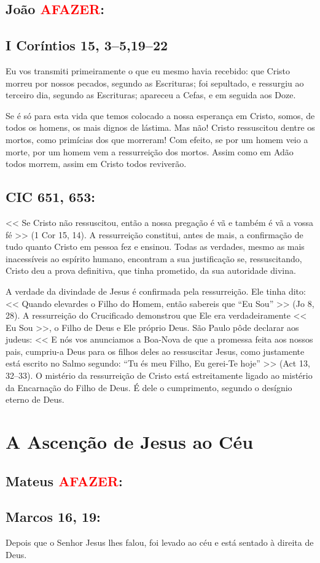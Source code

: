 \documentclass[10pt,a5paper]{book}
\newcommand{\from}[1]{\subsection*{#1}}
\newcommand{\TODO}{\textcolor{red}{\ttfamily AFAZER}}
\begin{document}
\from{João \TODO:}

\from{I Coríntios 15, 3--5,19--22}

Eu vos transmiti primeiramente o que eu mesmo havia recebido:
que Cristo morreu por nossos pecados, segundo as Escrituras;
foi sepultado, e ressurgiu ao terceiro dia, segundo as Escrituras;
apareceu a Cefas, e em seguida aos Doze.

Se é só para esta vida que temos colocado a nossa esperança em Cristo, somos, de todos os homens, os mais dignos de lástima.
Mas não! Cristo ressuscitou dentre os mortos, como primícias dos que morreram!
Com efeito, se por um homem veio a morte, por um homem vem a ressurreição dos mortos.
Assim como em Adão todos morrem, assim em Cristo todos reviverão.

\from{CIC 651, 653:}

<< Se Cristo não ressuscitou, então a nossa pregação é vã e também é vã a vossa fé >> (1 Cor 15, 14).
A ressurreição constitui, antes de mais, a confirmação de tudo quanto Cristo em pessoa fez e ensinou.
Todas as verdades, mesmo as mais inacessíveis ao espírito humano, encontram a sua justificação se, ressuscitando, Cristo deu a prova definitiva, que tinha prometido, da sua autoridade divina.

A verdade da divindade de Jesus é confirmada pela ressurreição.
Ele tinha dito:
<< Quando elevardes o Filho do Homem, então sabereis que ``Eu Sou'' >> (Jo 8, 28).
A ressurreição do Crucificado demonstrou que Ele era verdadeiramente << Eu Sou >>, o Filho de Deus e Ele próprio Deus.
São Paulo pôde declarar aos judeus:
<< E nós vos anunciamos a Boa-Nova de que a promessa feita aos nossos pais, cumpriu-a Deus para os filhos deles ao ressuscitar Jesus, como justamente está escrito no Salmo segundo:
``Tu és meu Filho, Eu gerei-Te hoje'' >> (Act 13, 32--33).
O mistério da ressurreição de Cristo está estreitamente ligado ao mistério da Encarnação do Filho de Deus.
É dele o cumprimento, segundo o desígnio eterno de Deus.


\section{A Ascenção de Jesus ao Céu}

\from{Mateus \TODO:}

\from{Marcos 16, 19:}

Depois que o Senhor Jesus lhes falou, foi levado ao céu e está sentado à direita de Deus.
\end{document}
